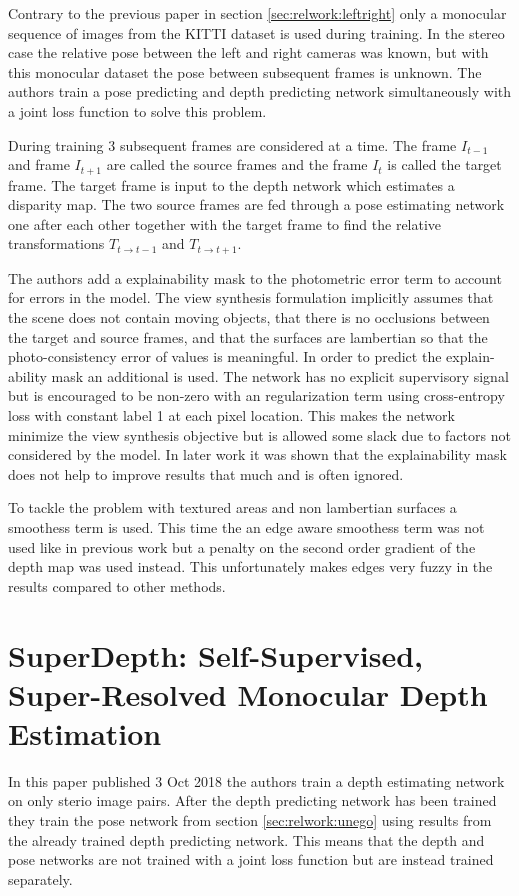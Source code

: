 Contrary to the previous paper in section \ref{sec:relwork:leftright} only a monocular sequence of images from the KITTI dataset is used during training. In the stereo case the relative pose between the left and right cameras was known, but with this monocular dataset the pose between subsequent frames is unknown. The authors train a pose predicting and depth predicting network simultaneously with a joint loss function to solve this problem.

During training 3 subsequent frames are considered at a time. The frame $I_{t-1}$ and frame $I_{t+1}$ are called the source frames and the frame $I_t$ is called the target frame. The target frame is input to the depth network which estimates a disparity map. The two source frames are fed through a pose estimating network one after each other together with the target frame to find the relative transformations $T_{t	\rightarrow t-1}$ and $T_{t	\rightarrow t+1}$.

The authors add a explainability mask to the photometric error term to account for errors in the model. The view synthesis formulation implicitly assumes that the scene does not contain moving objects, that there is no occlusions between the target and source frames, and that the surfaces are lambertian so that the photo-consistency error of \abbrRGB values is meaningful. In order to predict the explain-ability mask an additional \abbrCNN is used. The network has no explicit supervisory signal but is encouraged to be non-zero with an regularization term using cross-entropy loss with constant label 1 at each pixel location. This makes the network minimize the view synthesis objective but is allowed some slack due to factors not considered by the model. In later work it was shown that the explainability mask does not help to improve results that much and is often ignored.

To tackle the problem with textured areas and non lambertian surfaces a smoothess term is used. This time the an edge aware smoothess term was not used like in previous work but a penalty on the second order gradient of the depth map was used instead. This unfortunately makes edges very fuzzy in the results compared to other methods.

\section{SuperDepth: Self-Supervised, Super-Resolved Monocular Depth Estimation \cite{superdepth}}

In this paper published 3 Oct 2018 the authors train a depth estimating network on only sterio image pairs. After the depth predicting network has been trained they train the pose network from section \ref{sec:relwork:unego} using results from the already trained depth predicting network. This means that the depth and pose networks are not trained with a joint loss function but are instead trained separately.

